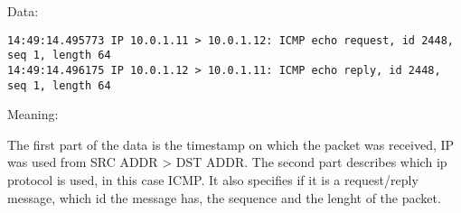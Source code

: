 Data: \newline

\begin{lstlisting}
14:49:14.495773 IP 10.0.1.11 > 10.0.1.12: ICMP echo request, id 2448, seq 1, length 64
14:49:14.496175 IP 10.0.1.12 > 10.0.1.11: ICMP echo reply, id 2448, seq 1, length 64
\end{lstlisting}
\newline
Meaning: \newline

The first part of the data is the timestamp on which the packet was received, IP was used from SRC ADDR > DST ADDR. The second part describes which ip protocol is used, in this case ICMP. It also specifies if it is a request/reply message, which id the message has, the sequence and the lenght of the packet.